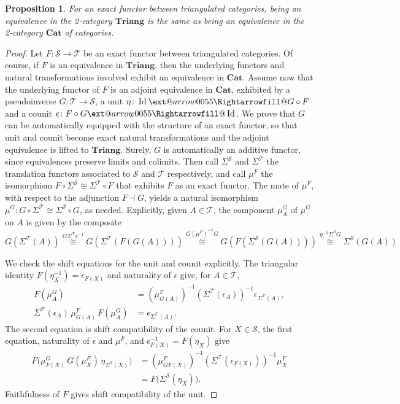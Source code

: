 \documentclass[11pt,reqno,a4paper]{amsart}
\makeatletter
\newtheorem{proposition}[theorem]{Proposition}
\theoremstyle{definition}
\theoremstyle{remark}
\newcommand{\T}{\mathcal{T}}
\renewcommand{\S}{\mathcal{S}}
\newcommand{\0}{\mathbf{0}}
\renewcommand{\1}{\mathbf{1}}
\newcommand{\Cat}{\mathbf{Cat}}
\newcommand{\Triang}{\mathbf{Triang}}
\def\:{\colon}
\def\c{\circ}
\newcommand{\iso}{\cong}
\newcommand{\Id}[1]{\operatorname{Id}_{#1}}
\newcommand{\aR}[2][]{
	\ext@arrow 0055{\Rightarrowfill@}{#1}{#2}}
\newcommand{\aiso}[1]{\overset{#1}{\iso}}
\makeatother
\begin{document}
\begin{proposition}\label{propequivinTriang}
    For an exact functor between triangulated categories, being an equivalence in the 2-category $\Triang$ is the same as being an equivalence in the 2-category $\Cat$ of categories.
\end{proposition}
\begin{proof}
    Let $F\:\S\to \T$ be an exact functor between triangulated categories. Of course, if $F$ is an equivalence in $\Triang$, then the underlying functors and natural transformations involved exhibit an equivalence in $\Cat$. Assume now that the underlying functor of $F$ is an adjoint equivalence in $\Cat$, exhibited by a pseudoinverse $G\:\T\to \S$, a unit $\eta\:\Id{}\aR{}G\c F$ and a counit $\epsilon\:F\c G\aR{}\Id{}$. We prove that $G$ can be automatically equipped with the structure of an exact functor, so that unit and counit become exact natural transformations and the adjoint equivalence is lifted to $\Triang$. Surely, $G$ is automatically an additive functor, since equivalences preserve limits and colimits. Then call $\Sigma^{\S}$ and $\Sigma^{\T}$ the translation functors associated to $\S$ and $\T$ respectively, and call $\mu^F$ the isomorphism $F\c \Sigma^{\S}\iso \Sigma^{\T}\c F$ that exhibits $F$ as an exact functor. The mate of $\mu^F$, with respect to the adjunction $F\dashv G$, yields a natural isomorphism $\mu^G\:G\c \Sigma^{\T}\iso \Sigma^{\S}\c G$, as needed. Explicitly, given $A\in \T$, the component $\mu^G_A$ of $\mu^G$ on $A$ is given by the composite
    $$G(\Sigma^{\T}(A))\aiso{G\Sigma^{\T}\epsilon^{-1}} G(\Sigma^{\T}(F(G(A))))\aiso{G(\mu^{F})^{-1}G}G(F(\Sigma^{\S}(G(A))))\aiso{\eta^{-1}\Sigma^{\S}G}\Sigma^{\S}(G(A))$$

    We check the shift equations for the unit and counit explicitly.
The triangular identity $F(\eta_X^{-1})=\epsilon_{F(X)}$
and naturality of $\epsilon$ give, for $A\in\T$,
\begin{align*}
 F(\mu^G_A)
 &= (\mu^F_{G(A)})^{-1}
    (\Sigma^{\T}(\epsilon_A))^{-1}
    \epsilon_{\Sigma^{\T}(A)},\\
 \Sigma^{\T}(\epsilon_A)\,\mu^F_{G(A)}\,F(\mu^G_A)
 &=\epsilon_{\Sigma^{\T}(A)}.
\end{align*}
The second equation is shift compatibility of the counit. For
$X\in\S$, the first equation, naturality of $\epsilon$ and
$\mu^F$, and $\epsilon_{F(X)}^{-1}=F(\eta_X)$ give
\begin{align*}
 F\bigl(\mu^G_{F(X)}\,G(\mu^F_X)\,\eta_{\Sigma^{\S}(X)}\bigr)
 &= (\mu^F_{GF(X)})^{-1}
    (\Sigma^{\T}(\epsilon_{F(X)}))^{-1}\mu^F_X\\
 &=F\bigl(\Sigma^{\S}(\eta_X)\bigr).
\end{align*}
Faithfulness of $F$ gives shift compatibility of the unit.


\end{proof}
\end{document}
